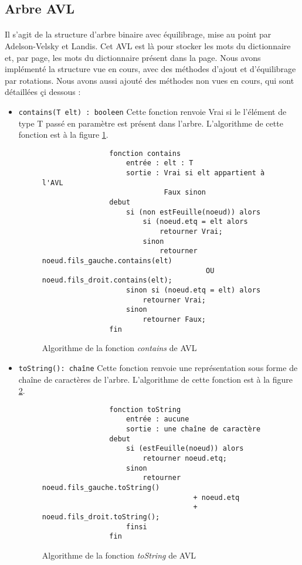 \documentclass[a4paper]{article}
\begin{document}
		\subsection{Arbre AVL}
		
		\paragraph{}{Il s'agit de la structure d'arbre binaire avec équilibrage, mise au point par Adelson-Velsky et Landis. Cet AVL est là pour stocker les mots du dictionnaire et, par page, les mots du dictionnaire présent dans la page. Nous avons implémenté la structure vue en cours, avec des méthodes d'ajout et d'équilibrage par rotations. Nous avons aussi ajouté des méthodes non vues en cours, qui sont détaillées çi dessous :}
		
		\begin{itemize}
			\item \verb|contains(T elt) : booleen| Cette fonction renvoie Vrai si le l'élément de type T passé en paramètre est présent dans l'arbre. L'algorithme de cette fonction est à la figure \ref{algo_contains}.
			\begin{figure}
	    	    \begin{verbatim}
	    	    fonction contains
	    	        entrée : elt : T
	    	        sortie : Vrai si elt appartient à l'AVL
	    	                 Faux sinon
	    	    debut
	    	        si (non estFeuille(noeud)) alors
	    	            si (noeud.etq = elt alors
	    	                retourner Vrai;
	    	            sinon
	    	                retourner noeud.fils_gauche.contains(elt) 
	    	                           OU noeud.fils_droit.contains(elt);
	    	        sinon si (noeud.etq = elt) alors
	    	            retourner Vrai;
	    	        sinon
	    	            retourner Faux;
	    	    fin
	    	    \end{verbatim}
	    	    \caption{Algorithme de la fonction \textit{contains} de AVL \label{algo_contains} }
	    	\end{figure}
			\item \verb|toString(): chaîne| Cette fonction renvoie une représentation sous forme de chaîne de caractères de l'arbre. L'algorithme de cette fonction est à la figure \ref{algo_toString_avl}.
			
			\begin{figure}
	    	    \begin{verbatim}
	    	    fonction toString
	    	        entrée : aucune
	    	        sortie : une chaîne de caractère
	    	    debut
	    	        si (estFeuille(noeud)) alors
	    	            retourner noeud.etq;
	    	        sinon
	    	            retourner noeud.fils_gauche.toString() 
	    	                        + noeud.etq 
	    	                        + noeud.fils_droit.toString();
	    	        finsi
	    	    fin
	    	    \end{verbatim}
	    	    \caption{Algorithme de la fonction \textit{toString} de AVL \label{algo_toString_avl} }
	    	\end{figure}
	    	

\end{itemize}
\end{document}
